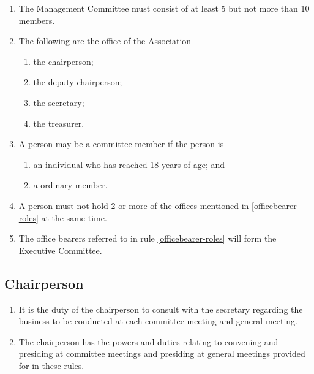 \documentclass[../constitution.tex]{subfiles}
\begin{document}
\begin{enumerate}

\item The Management Committee must consist of at least 5 but not more than 10 members. 
\item The following are the office  of the Association --- \label{officebearer-roles}

  \begin{enumerate}
  
  \item the chairperson;
  \item the deputy chairperson;
  \item the secretary;
  \item the treasurer.
  \end{enumerate}
\item A person may be a committee member if the person is --- \label{committee-eligibility}

  \begin{enumerate}
  
  \item an individual who has reached 18 years of age; and
  \item a ordinary member.
  \end{enumerate}
\item A person must not hold 2 or more of the offices mentioned in  \ref{officebearer-roles} at the same time.
\item The office bearers referred to in rule \ref{officebearer-roles} will form the Executive Committee. 
\end{enumerate}

\hypertarget{chairperson}{%
\subsection{Chairperson}\label{chairperson}}

\begin{enumerate}

\item It is the duty of the chairperson to consult with the secretary regarding the business to be conducted at each committee meeting and general meeting.
\item The chairperson has the powers and duties relating to convening and presiding at committee meetings and presiding at general meetings provided for in these rules.
\end{enumerate}
\end{document}
